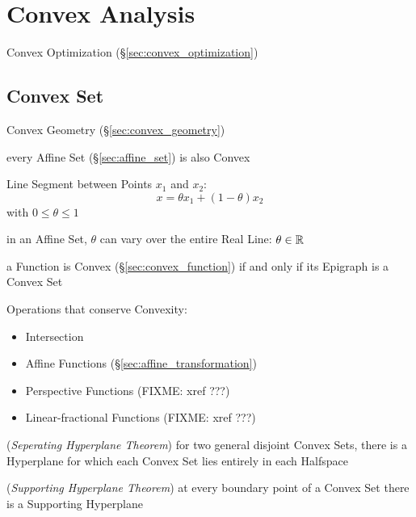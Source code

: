 


\section{Convex Analysis}\label{sec:convex_analysis}

\fist Convex Optimization (\S\ref{sec:convex_optimization})



\subsection{Convex Set}\label{sec:convex_set}


\fist Convex Geometry (\S\ref{sec:convex_geometry})

every Affine Set (\S\ref{sec:affine_set}) is also Convex

Line Segment between Points $x_1$ and $x_2$:
\[
  x = \theta x_1 + (1-\theta) x_2
\]
with $0 \leq \theta \leq 1$

\fist in an Affine Set, $\theta$ can vary over the entire Real Line: $\theta
\in \mathbb{R}$

a Function is Convex (\S\ref{sec:convex_function}) if and only if its Epigraph
is a Convex Set

Operations that conserve Convexity:
\begin{itemize}
  \item Intersection
  \item Affine Functions (\S\ref{sec:affine_transformation})
  \item Perspective Functions (FIXME: xref ???)
  \item Linear-fractional Functions (FIXME: xref ???)
\end{itemize}

(\emph{Seperating Hyperplane Theorem}) for two general disjoint Convex Sets,
there is a Hyperplane for which each Convex Set lies entirely in each Halfspace

(\emph{Supporting Hyperplane Theorem}) at every boundary point of a Convex Set
there is a Supporting Hyperplane

